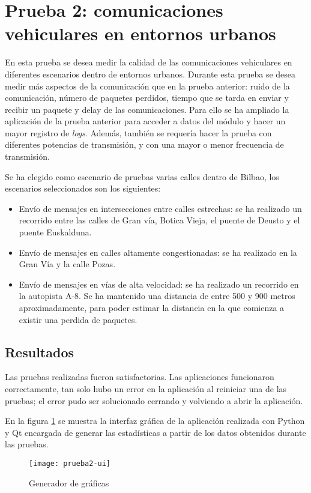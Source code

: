 \section{Prueba 2: comunicaciones vehiculares en entornos urbanos}
En esta prueba se desea medir la calidad de las comunicaciones vehiculares en diferentes escenarios dentro de entornos urbanos. Durante esta prueba se desea medir más aspectos de la comunicación que en la prueba anterior: ruido de la comunicación, número de paquetes perdidos, tiempo que se tarda en enviar y recibir un paquete y delay de las comunicaciones. Para ello se ha ampliado la aplicación de la prueba anterior para acceder a datos del módulo y hacer un mayor registro de \emph{logs}. Además, también se requería hacer la prueba con diferentes potencias de transmisión, y con una mayor o menor frecuencia de transmisión.

Se ha elegido como escenario de pruebas varias calles dentro de Bilbao, los escenarios seleccionados son los siguientes:
\begin{itemize}
	\item Envío de mensajes en intersecciones entre calles estrechas: se ha	realizado un recorrido entre las calles de Gran vía, Botica Vieja, el puente de Deusto y el puente Euskalduna.
	\item Envío de mensajes en calles altamente congestionadas: se ha realizado	en la Gran Vía y la calle Pozas.
	\item Envío de mensajes en vías de alta velocidad: se ha realizado un recorrido en la	autopista A-8. Se ha mantenido una distancia de entre 500 y 900 metros aproximadamente, para poder estimar la distancia en la que comienza a existir una perdida de paquetes.
\end{itemize}

\subsection{Resultados}
Las pruebas realizadas fueron satisfactorias. Las aplicaciones funcionaron correctamente, tan solo hubo un error en la aplicación al reiniciar una de las pruebas; el error pudo ser solucionado cerrando y volviendo a abrir la aplicación.

En la figura \ref{fig:prueba2-ui} se muestra la interfaz gráfica de la aplicación realizada con Python y Qt encargada de generar las estadísticas a partir de los datos obtenidos durante las pruebas.

\begin{figure}[H]
	\begin{center}
		\texttt{[image: prueba2-ui]}
		\caption{Generador de gráficas}
		\label{fig:prueba2-ui}
	\end{center}
\end{figure}